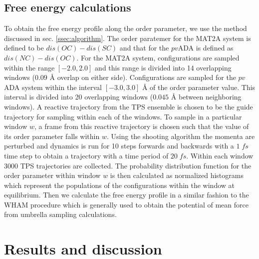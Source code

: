 \documentclass[journal=jpcbfk,manuscript=article,layout=twocolumn]{achemso}
\begin{document}
\subsection{Free energy calculations}
To obtain the free energy profile along the order parameter, we use the method 
discussed in sec. \ref{ssec:algorithm}. The order paratemer for the MAT2A system 
is defined to be $dis(OC)-dis(SC)$ and that for the $pv$ADA is defined as 
$dis(NC)-dis(OC)$. For the MAT2A system, configurations are sampled within 
the range $[-2.0,2.0]$ and this range is divided into 14 overlapping windows 
($0.09$ {\AA} overlap on either side). 
Configurations are sampled for the $pv$ADA system within the interval $[-3.0, 3.0]$ {\AA}
of the order parameter value. 
This interval is divided into 20 overlapping windows ($0.045$ {\AA} between 
neighboring windows). A reactive trajectory from the TPS ensemble is chosen to be the guide trajectory 
for sampling within each of the windows. To sample in a particular window $w$, a 
frame from this reactive trajectory is chosen such that the value of its 
order parameter falls within $w$. Using the shooting algorithm
the momenta are perturbed and dynamics is run for 10 steps forwards and backwards with a 
$1\;fs$ time step to obtain a trajectory with a time period of $20\;fs$.    
Within each window 3000 TPS trajectories are collected. The 
probability distribution function for the order parameter within window $w$ 
is then calculated as normalized histograms which represent the populations 
of the configurations within the window at equilibrium. 
Then we calculate the free energy profile in a similar fashion to the WHAM 
procedure \cite{Kumar92JComputChem13p1011} which is generally used to obtain the 
potential of mean force from umbrella sampling calculations. 
\section{Results and discussion}
\end{document}
